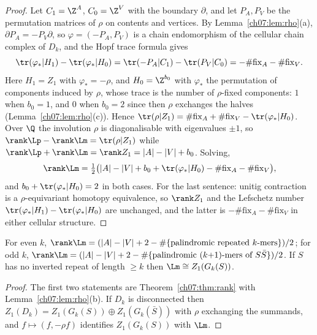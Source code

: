 \begin{proof}
Let $C_1=\Z^A$, $C_0=\Z^V$ with the boundary $\partial$, and let $P_A,P_V$ be the
permutation matrices of $\rho$ on contents and vertices. By Lemma~\ref{ch07:lem:rho}(a),
$\partial P_A=-P_V\partial$, so $\varphi=(-P_A,P_V)$ is a chain endomorphism of the cellular
chain complex of $D_k$, and the Hopf trace formula gives
\[
  \tr(\varphi_*|H_1)-\tr(\varphi_*|H_0)=\tr(-P_A|C_1)-\tr(P_V|C_0)
  =-\#\mathrm{fix}_A-\#\mathrm{fix}_V .
\]
Here $H_1=Z_1$ with $\varphi_*=-\rho$, and $H_0=\Z^{b_0}$ with $\varphi_*$ the permutation of
components induced by $\rho$, whose trace is the number of $\rho$-fixed components: $1$ when
$b_0=1$, and $0$ when $b_0=2$ since then $\rho$ exchanges the halves
(Lemma~\ref{ch07:lem:rho}(c)). Hence $\tr(\rho|Z_1)=\#\mathrm{fix}_A+\#\mathrm{fix}_V-
\tr(\varphi_*|H_0)$. Over $\Q$ the involution $\rho$ is diagonalisable with eigenvalues
$\pm1$, so $\rank\Lp-\rank\Lm=\tr(\rho|Z_1)$ while $\rank\Lp+\rank\Lm=\rank Z_1=|A|-|V|+b_0$.
Solving,
\[
  \rank\Lm=\tfrac12\big(|A|-|V|+b_0+\tr(\varphi_*|H_0)-\#\mathrm{fix}_A-\#\mathrm{fix}_V\big),
\]
and $b_0+\tr(\varphi_*|H_0)=2$ in both cases. For the last sentence: unitig contraction is a
$\rho$-equivariant homotopy equivalence, so $\rank Z_1$ and the Lefschetz number
$\tr(\varphi_*|H_1)-\tr(\varphi_*|H_0)$ are unchanged, and the latter is
$-\#\mathrm{fix}_A-\#\mathrm{fix}_V$ in either cellular structure.
\end{proof}

\begin{corollary}\label{ch07:cor:parity}
For even $k$, $\rank\Lm=(|A|-|V|+2-\#\{\text{palindromic repeated $k$-mers}\})/2$; for odd
$k$, $\rank\Lm=(|A|-|V|+2-\#\{\text{palindromic $(k{+}1)$-mers of $S\bar S$}\})/2$. If $S$
has no inverted repeat of length $\ge k$ then $\Lm\cong Z_1(G_k(S))$.
\end{corollary}

\begin{proof}
The first two statements are Theorem~\ref{ch07:thm:rank} with Lemma~\ref{ch07:lem:rho}(b). If $D_k$
is disconnected then $Z_1(D_k)=Z_1(G_k(S))\oplus Z_1(G_k(\bar S))$ with $\rho$ exchanging the
summands, and $f\mapsto(f,-\rho f)$ identifies $Z_1(G_k(S))$ with $\Lm$.
\end{proof}

